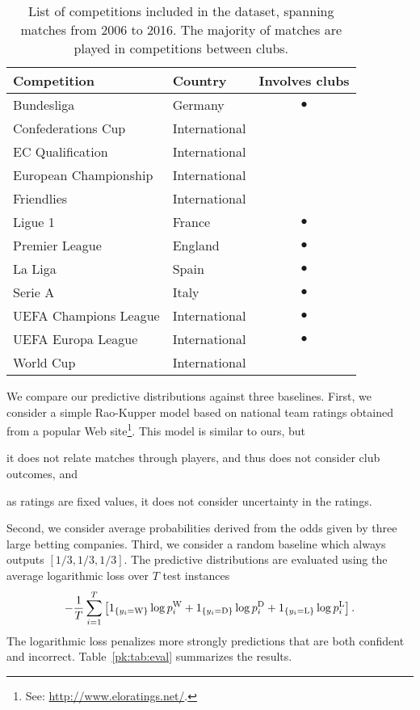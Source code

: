 \begin{table}
  \caption{
List of competitions included in the dataset, spanning matches from 2006 to 2016.
The majority of matches are played in competitions between clubs.}
  \label{pk:tab:competitions}
  \centering
  \begin{tabular}{llc}
    \toprule
    Competition           & Country       & Involves clubs      \\
    \midrule
    Bundesliga            & Germany       & $\bullet$     \\
    Confederations Cup    & International & \\
    EC Qualification      & International & \\
    European Championship & International & \\
    Friendlies            & International & \\
    Ligue 1               & France        & $\bullet$     \\
    Premier League        & England       & $\bullet$     \\
    La Liga               & Spain         & $\bullet$     \\
    Serie A               & Italy         & $\bullet$     \\
    UEFA Champions League & International & $\bullet$     \\
    UEFA Europa League    & International & $\bullet$     \\
    World Cup             & International & \\
    \bottomrule
  \end{tabular}
\end{table}

We compare our predictive distributions against three baselines.
First, we consider a simple Rao-Kupper model based on national team ratings obtained from a popular Web site\footnote{See: \url{http://www.eloratings.net/}.}.
This model is similar to ours, but
\begin{enuminline}
\item it does not relate matches through players, and thus does not consider club outcomes, and
\item as ratings are fixed values, it does not consider uncertainty in the ratings.
\end{enuminline}
Second, we consider average probabilities derived from the odds given by three large betting companies.
Third, we consider a random baseline which always outputs $[1/3, 1/3, 1/3]$.
The predictive distributions are evaluated using the average logarithmic loss over $T$ test instances
\begin{align*}
- \frac{1}{T} \sum_{i=1}^{T} \left[
1_{\left \{ y_i = \text{W} \right \} } \log p^{\text{W}}_i
+ 1_{\left \{ y_i = \text{D} \right \} } \log p^{\text{D}}_i
+ 1_{\left \{ y_i = \text{L} \right \} } \log p^{\text{L}}_i
\right].
\end{align*}
The logarithmic loss penalizes more strongly predictions that are both confident and incorrect.
Table~\ref{pk:tab:eval} summarizes the results.


